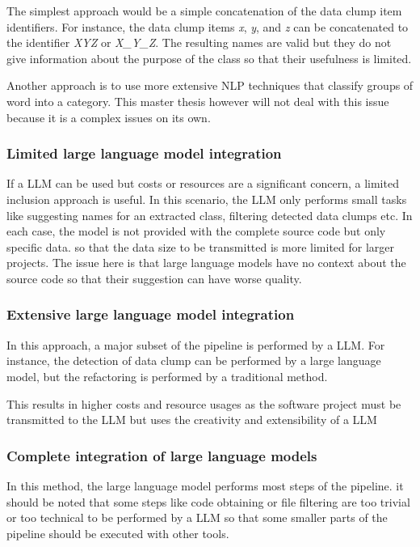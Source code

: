 The simplest approach would be a simple concatenation of the data clump item identifiers. For instance, the data clump items \textit{x}, \textit{y}, and \textit{z} can be concatenated to  the identifier \textit{XYZ} or \textit{X\_Y\_Z}. The resulting names are valid but they do not give information about the purpose of the class so that their usefulness is limited.

Another approach is to use more extensive \ac{NLP} techniques that classify groups of word into a category. This master thesis however will not deal with this issue because it is a complex issues on its own.

\subsubsection{Limited large language model integration}

If a \ac{LLM} can be used but costs or resources are a significant concern, a limited inclusion approach is useful. In this scenario, the \ac{LLM} only performs small tasks like suggesting names for an extracted class, filtering detected data clumps etc. In each case, the model is not provided with the  complete source code but only specific data. so that the data size to be transmitted is more limited for larger projects. The issue here is that large language models have no context about the source code so that their suggestion can have worse quality. 

\subsubsection{Extensive large language model integration }

In this approach, a major subset of the pipeline is performed by a \ac{LLM}. For instance, the detection of data clump can be performed by a large language model, but the refactoring is performed by a traditional method. 

This results in higher costs and resource usages as the software project must be transmitted to the \ac{LLM} but uses the creativity and extensibility of a \ac{LLM}

\subsubsection{Complete integration of large language models}

In this method, the large language model performs most steps of the pipeline. it should be noted that some steps like code obtaining or file filtering are too trivial or too technical to be performed by a \ac{LLM} so that some smaller parts of the pipeline should be executed with other tools. 

